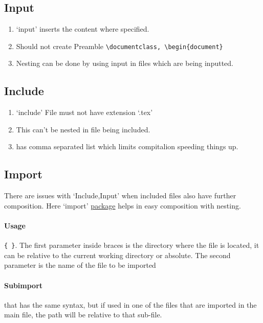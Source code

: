 \documentclass{report}[a4paper,12pt] %
\begin{document}
\subsection{Input}
\begin{enumerate}
  \item `input' inserts the content where specified.
  \item Should not create Preamble \verb|\documentclass, \begin{document}|
  \item Nesting can be done by using input in files which are being inputted.
\end{enumerate}

\subsection{Include}
\begin{enumerate}
  \item `include' File must not have extension `.tex'
  \item This can't be nested in file being included.
  \item \verb|| has comma separated list which limits compitalion speeding things up.
\end{enumerate}

\subsection{Import}
There are issues with `Include,Input' when included files also have further composition. Here `import' \href{https://mirror.niser.ac.in/ctan/macros/latex/contrib/import/import.pdf}{package} helps in easy composition with nesting. 

\paragraph{Usage} \verb|{ }|. The first parameter inside braces is the directory where the file is located, it can be relative to the current working directory or absolute. The second parameter is the name of the file to be imported

\paragraph{Subimport} \verb|| that has the same syntax, but if used in one of the files that are imported in the main file, the path will be relative to that sub-file.
\end{document}
